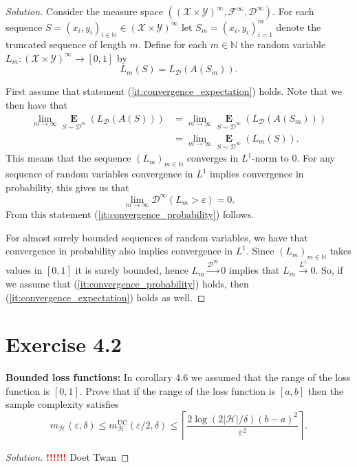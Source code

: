 \documentclass[10pt, a4paper, twoside]{amsart}
\newcommand{\N}{\ensuremath{\mathbb{N}}}
\newcommand{\Ev}{\operatorname*{\ensuremath{\mathbf{E}}}} %
\newcommand{\Fa}{\ensuremath{\mathcal{F}}} %
\newenvironment{solution}
               {\let\oldqedsymbol=\qedsymbol
                \renewcommand{\qedsymbol}{$\blacktriangleleft$}
                \begin{proof}[Solution]}
               {\end{proof}
                \renewcommand{\qedsymbol}{\oldqedsymbol}}
\newcommand{\TODO}{\textcolor{red}{\textbf{!!!!!! }}}
\begin{document}
\begin{solution}
Consider the measure space $((\mathcal{X}\times\mathcal{Y})^\infty, \Fa^{\infty}, \mathcal{D}^\infty)$.
For each sequence $S=(x_i,y_i)_{i \in \N} \in (\mathcal{X}\times\mathcal{Y})^\infty$
let $S_m=(x_i,y_i)_{i=1}^{m}$ denote the truncated sequence of length $m$.
Define for each $m \in \N$ the random variable $L_m:(\mathcal{X}\times\mathcal{Y})^\infty \to [0,1]$ by
\begin{equation*}
 L_m(S)=L_{\mathcal{D}}(A(S_m)).
\end{equation*}

First assume that statement (\ref{it:convergence_expectation}) holds. 
Note that we then have that 
\begin{align*}
 \lim_{m\to \infty}\Ev_{S\sim \mathcal{D}^{m}}(L_{\mathcal{D}}(A(S))) &= 
 \lim_{m\to \infty}\Ev_{S\sim \mathcal{D}^{\infty}}(L_{\mathcal{D}}(A(S_m))) \\
 & = \lim_{m\to \infty}\Ev_{S\sim \mathcal{D}^{\infty}}(L_m(S)).
\end{align*}
This means that the sequence $(L_m)_{m \in \N}$ converges in $L^1$-norm to $0$.
For any sequence of random variables convergence in $L^1$ implies convergence in probability, this gives us that
\begin{equation*}
 \lim_{m\to \infty}\mathcal{D}^{\infty}(L_m>\varepsilon)=0.
\end{equation*}
From this statement (\ref{it:convergence_probability}) follows.

For almost surely bounded sequences of random variables, we have that convergence in probability also implies convergence in 
$L^1$. Since $(L_m)_{m\in \N}$ takes values in $[0,1]$ it is surely bounded, hence $L_m \stackrel{\mathcal{D}^{\infty}}{\to} 0$ implies that $L_m \stackrel{L^1}{\to} 0$. So, if we assume that (\ref{it:convergence_probability}) holds, then (\ref{it:convergence_expectation}) holds as well.
\end{solution}

\section*{Exercise 4.2}
\textbf{Bounded loss functions:}
In corollary 4.6 we assumed that the range of the loss function is $[0,1]$. Prove that if the range of the loss function is $[a,b]$ then the sample complexity satisfies
\begin{equation*}
  m_{\mathcal{H}}(\varepsilon , \delta) \leq m_{\mathcal{H}}^{\text{UC}}(\varepsilon /2, \delta)
  \leq \left\lceil \frac{2\log (2|\mathcal{H}|/\delta) (b-a)^2}{\varepsilon^2} \right\rceil .
\end{equation*}
\begin{solution}
  \TODO Doet Twan
\end{solution}
\end{document}
